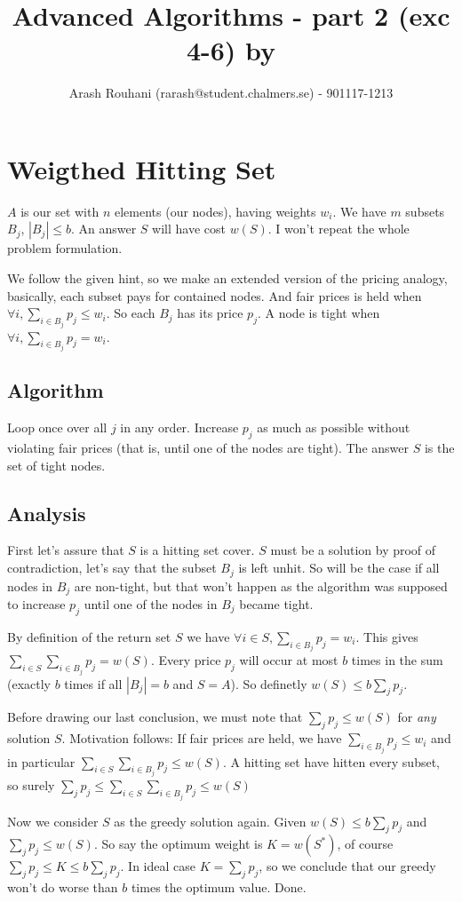 \documentclass[a4paper,11pt]{article}
\title{Advanced Algorithms - part 2 (exc 4-6) by}
\author{Arash Rouhani (rarash@student.chalmers.se) - 901117-1213}
\begin{document}
\maketitle



\section{Weigthed Hitting Set}

$A$ is our set with $n$ elements (our nodes), having weights $w_i$.
We have $m$ subsets $B_j$, $|B_j| \leq b$. An answer $S$ will have cost $w(S)$.
I won't repeat the whole problem formulation.

We follow the given hint, so we make an extended version of
the pricing analogy, basically, each subset pays for contained nodes.
And fair prices is held when $\forall i, \sum_{i \in B_j} p_j \leq w_i$.
So each $B_j$ has its price $p_j$.
A node is tight when $\forall i, \sum_{i \in B_j} p_j = w_i$.

\subsection{Algorithm}

Loop once over all $j$ in any order. Increase $p_j$ as much as possible
without violating fair prices (that is, until one of the nodes are tight).
The answer $S$ is the set of tight nodes.

\subsection{Analysis}

First let's assure that $S$ is a hitting set cover. $S$ must
be a solution by proof of contradiction, let's say that
the subset $B_j$ is left unhit. So will be the case if all nodes in
$B_j$ are non-tight, but that won't happen as the algorithm
was supposed to increase $p_j$ until one of the nodes in $B_j$
became tight.

By definition of the return set $S$ we have
$\forall i \in S, \sum_{i \in B_j} p_j = w_i$.
This gives $ \sum_{i \in S} \sum_{i \in B_j} p_j = w(S)$.
Every price $p_j$ will occur at most $b$ times in the sum
(exactly $b$ times if all $|B_j| = b$ and $S = A$).
So definetly $w(S) \leq b \sum_{j} p_j$.

Before drawing our last conclusion, we must note that
$\sum_{j} p_j \leq w(S) $ for \emph{any} solution $S$.
Motivation follows:
If fair prices are held, we have
$\sum_{i \in B_j} p_j \leq w_i$ and in particular
$\sum_{i \in S} \sum_{i \in B_j} p_j \leq w(S)$.
A hitting set have hitten every subset, so surely
$\sum_{j} p_j \leq \sum_{i \in S} \sum_{i \in B_j} p_j \leq w(S)$

Now we consider $S$ as the greedy solution again.
Given $w(S) \leq b \sum_{j} p_j$ and $\sum_{j} p_j \leq w(S)$.
So say the optimum weight is $K=w(S^*)$, of course
$\sum_{j} p_j \leq K \leq b \sum_{j} p_j$.
In ideal case $K = \sum_{j} p_j$,
so we conclude that our greedy won't do worse than $b$
times the optimum value. Done.
\end{document}
